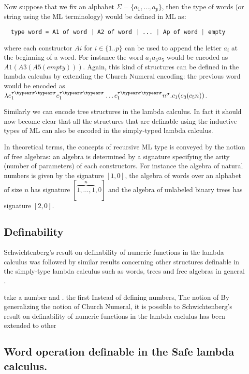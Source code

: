 Now suppose that we fix an alphabet $\Sigma = \{ a_1, \ldots, a_p
\}$, then the type of words (or string using the ML terminology)
would be defined in ML as:
\begin{verbatim}
  type word = A1 of word | A2 of word | ... | Ap of word | empty
\end{verbatim}
where each constructor $Ai$ for $i \in\{1..p\}$ can be used to
append the letter $a_i$ at the beginning of a word. For instance the
word $a_1 a_3 a_5$ would be encoded as $A1(A3(A5(empty)))$. Again,
this kind of structures can be defined in the lambda calculus by
extending the Church Numeral encoding: the previous word would be
encoded as $\lambda c_1^{\tau\typear\sigma\typear\sigma}
c_1^{\tau\typear\sigma\typear\sigma} \ldots
c_1^{\tau\typear\sigma\typear\sigma} n^\sigma . c_1 ( c_3 (c_5 n))$.

Similarly we can encode tree structures in the lambda calculus. In
fact it should now become clear that all the structures that are
definable using the inductive types of ML can also be encoded in the
simply-typed lambda calculus.


In theoretical terms, the concepts of recursive ML type is conveyed
by the notion of free algebras: an algebra is determined by a
signature specifying the arity (\ie number of parameters) of each
constructors. For instance the algebra of natural numbers is given
by the signature $[1,0]$, the algebra of words over an alphabet of
size $n$ has signature $[\overbrace{1,\ldots,1}^{n},0]$ and the
algebra of unlabeled binary trees has signature $[2,0]$.


\subsection{Definability}

Schwichtenberg's result on definability of numeric functions in the
lambda calculus was followed by similar results concerning other
structures definable in the simply-type lambda calculus such as
words, trees and free algebras in general
\cite{DBLP:journals/tcs/Leivant93,DBLP:journals/apal/Zaionc91,702481,DBLP:journals/tcs/Zaionc87}.






take a number and . the first Instead of defining numbers, The
notion of By generalizing the notion of Church Numeral, it is
possible to Schwichtenberg's result on definability of numeric
functions in the lambda caclulus has been extended to other


\subsection{Word operation definable in the Safe lambda calculus.}
